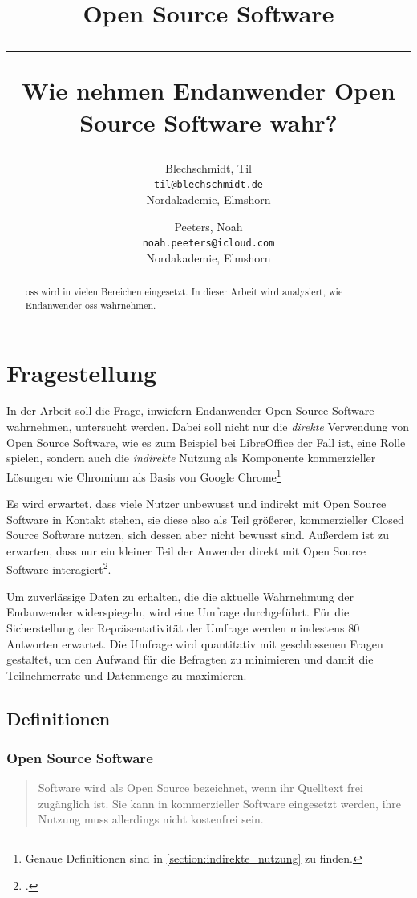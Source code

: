 \documentclass[a4paper]{article}
\title{Open Source Software \\
    \noindent\rule[0.25ex]{\linewidth}{0.5pt}
    \large Wie nehmen Endanwender Open Source Software wahr?
}
\author{
  Blechschmidt, Til\\
  \texttt{til@blechschmidt.de}\\
  Nordakademie, Elmshorn
  \and
  Peeters, Noah\\
  \texttt{noah.peeters@icloud.com}\\
  Nordakademie, Elmshorn
}
\begin{document}
    \thispagestyle{fancy}
    \maketitle

    \clearpage
    \begin{abstract}
         \gls{oss} wird in vielen Bereichen eingesetzt. In dieser Arbeit wird analysiert, wie Endanwender \gls{oss} wahrnehmen.
    \end{abstract}
    \newpage

    \tableofcontents
    \listoffigures
    \listoftables
    \clearpage

    
                    
    \section{Fragestellung}
        In der Arbeit soll die Frage, inwiefern Endanwender Open Source Software wahrnehmen, untersucht werden. Dabei soll nicht nur die \emph{direkte} Verwendung von Open Source Software, wie es zum Beispiel bei LibreOffice der Fall ist, eine Rolle spielen, sondern auch die \emph{indirekte} Nutzung als Komponente kommerzieller Lösungen wie Chromium als Basis von Google Chrome\footnote{Genaue Definitionen sind in \ref{section:indirekte_nutzung} zu finden.}
		
		Es wird erwartet, dass viele Nutzer unbewusst und indirekt mit Open Source Software in Kontakt stehen, sie diese also als Teil größerer, kommerzieller Closed Source Software nutzen, sich dessen aber nicht bewusst sind. Außerdem ist zu erwarten, dass nur ein kleiner Teil der Anwender direkt mit Open Source Software interagiert\footcite{oss:lotus-to-linux}.
		
		Um zuverlässige Daten zu erhalten, die die aktuelle Wahrnehmung der Endanwender widerspiegeln, wird eine Umfrage durchgeführt. Für die Sicherstellung der Repräsentativität der Umfrage werden mindestens 80 Antworten erwartet.
		Die Umfrage wird quantitativ mit geschlossenen Fragen gestaltet, um den Aufwand für die Befragten zu minimieren und damit die Teilnehmerrate und Datenmenge zu maximieren. %
		
		\subsection{Definitionen} %
            \subsubsection{Open Source Software}
                \begin{quote} 
                    \centering 
                    Software wird als Open Source bezeichnet, wenn ihr Quelltext frei zugänglich ist. Sie kann in kommerzieller Software eingesetzt werden, ihre Nutzung muss allerdings nicht kostenfrei sein. 
                \end{quote}
                
\end{document}
